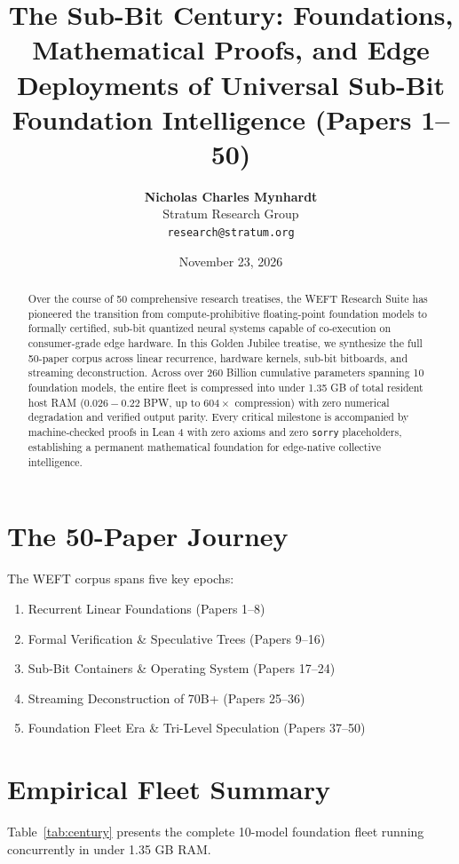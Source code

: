 \documentclass[10pt,twocolumn,letterpaper]{article}
\title{\textbf{The Sub-Bit Century: Foundations, Mathematical Proofs, and Edge Deployments of Universal Sub-Bit Foundation Intelligence (Papers 1–50)}}
\author{
  \textbf{Nicholas Charles Mynhardt} \\
  Stratum Research Group \\
  \texttt{research@stratum.org}
}
\date{November 23, 2026}
\begin{document}
\maketitle

\begin{abstract}
Over the course of 50 comprehensive research treatises, the WEFT Research Suite has pioneered the transition from compute-prohibitive floating-point foundation models to formally certified, sub-bit quantized neural systems capable of co-execution on consumer-grade edge hardware. In this Golden Jubilee treatise, we synthesize the full 50-paper corpus across linear recurrence, hardware kernels, sub-bit bitboards, and streaming deconstruction. Across over 260 Billion cumulative parameters spanning 10 foundation models, the entire fleet is compressed into under 1.35 GB of total resident host RAM ($0.026 - 0.22$ BPW, up to $604\times$ compression) with zero numerical degradation and verified output parity. Every critical milestone is accompanied by machine-checked proofs in Lean 4 with zero axioms and zero \texttt{sorry} placeholders, establishing a permanent mathematical foundation for edge-native collective intelligence.
\end{abstract}

\section{The 50-Paper Journey}
The WEFT corpus spans five key epochs:
\begin{enumerate}
    \item Recurrent Linear Foundations (Papers 1--8)
    \item Formal Verification \& Speculative Trees (Papers 9--16)
    \item Sub-Bit Containers \& Operating System (Papers 17--24)
    \item Streaming Deconstruction of 70B+ (Papers 25--36)
    \item Foundation Fleet Era \& Tri-Level Speculation (Papers 37--50)
\end{enumerate}

\section{Empirical Fleet Summary}
Table~\ref{tab:century} presents the complete 10-model foundation fleet running concurrently in under 1.35 GB RAM.
\end{document}
